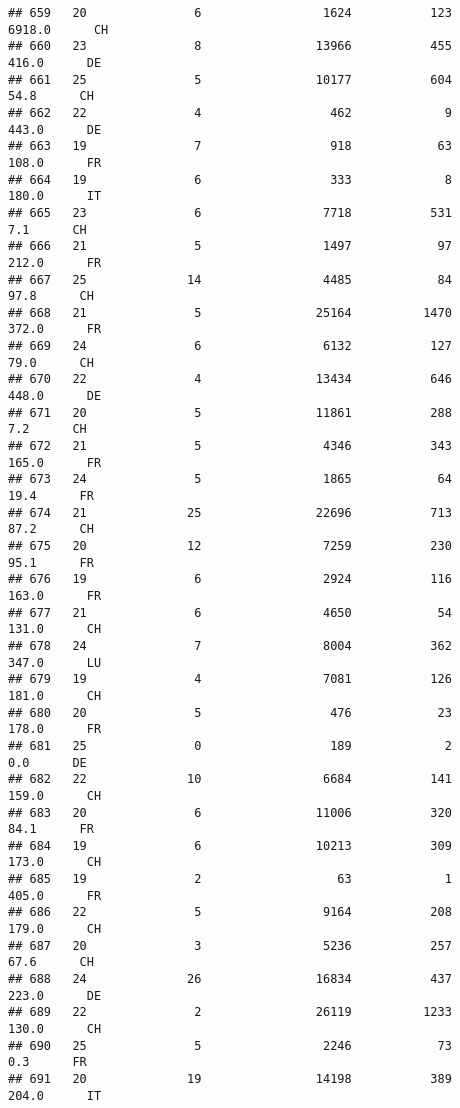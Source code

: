 \documentclass[
]{article}
\begin{document}
\begin{verbatim}
## 659   20               6                 1624           123   6918.0      CH
## 660   23               8                13966           455    416.0      DE
## 661   25               5                10177           604     54.8      CH
## 662   22               4                  462             9    443.0      DE
## 663   19               7                  918            63    108.0      FR
## 664   19               6                  333             8    180.0      IT
## 665   23               6                 7718           531      7.1      CH
## 666   21               5                 1497            97    212.0      FR
## 667   25              14                 4485            84     97.8      CH
## 668   21               5                25164          1470    372.0      FR
## 669   24               6                 6132           127     79.0      CH
## 670   22               4                13434           646    448.0      DE
## 671   20               5                11861           288      7.2      CH
## 672   21               5                 4346           343    165.0      FR
## 673   24               5                 1865            64     19.4      FR
## 674   21              25                22696           713     87.2      CH
## 675   20              12                 7259           230     95.1      FR
## 676   19               6                 2924           116    163.0      FR
## 677   21               6                 4650            54    131.0      CH
## 678   24               7                 8004           362    347.0      LU
## 679   19               4                 7081           126    181.0      CH
## 680   20               5                  476            23    178.0      FR
## 681   25               0                  189             2      0.0      DE
## 682   22              10                 6684           141    159.0      CH
## 683   20               6                11006           320     84.1      FR
## 684   19               6                10213           309    173.0      CH
## 685   19               2                   63             1    405.0      FR
## 686   22               5                 9164           208    179.0      CH
## 687   20               3                 5236           257     67.6      CH
## 688   24              26                16834           437    223.0      DE
## 689   22               2                26119          1233    130.0      CH
## 690   25               5                 2246            73      0.3      FR
## 691   20              19                14198           389    204.0      IT

\end{verbatim}
\end{document}
